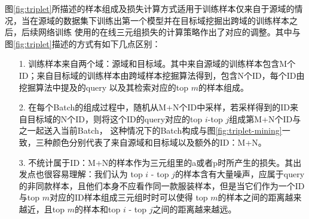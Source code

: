 图\ref{fig:triplet}所描述的样本组成及损失计算方式适用于训练样本仅来自于源域的情况，当在源域的数据集下训练出第一个模型并在目标域挖掘出跨域的训练样本之后，后续网络训练
使用的在线三元组损失的计算策略作出了对应的调整。其中与图\ref{fig:triplet}描述的方式有如下几点区别：
\begin{itemize}
  \item[1.]训练样本来自两个域：源域和目标域。其中来自源域的训练样本包含M个ID；来自目标域的训练样本由跨域样本挖掘算法得到，包含N个ID，每个ID由挖掘算法中提及的query
    以及其检索对应的top $m$的样本组成。
  \item[2.]在每个Batch的组成过程中，随机从M+N个ID中采样，若采样得到的ID来自目标域的N个ID，则将这个ID的query对应的top $i$-top $j$组成第M+N个ID与之一起送入当前Batch，
    这种情况下的Batch构成与图\ref{fig:triplet-mining}一致，三种颜色分别代表了来自源域和目标域以及额外的ID：M+N。
  \item[3.]不统计属于ID：M+N的样本作为三元组里的a或者p时所产生的损失。其出发点也很容易理解：我们认为
    top $i$ - top $j$的样本含有大量噪声，应属于query的非同款样本，且他们本身不应看作同一款服装样本，但是当它们作为一个ID与top $m$对应的ID样本组成三元组时时可以使得
    top $m$的样本之间的距离越来越近，且top $m$的样本和top $i$ - top $j$之间的距离越来越远。
\end{itemize}


 
